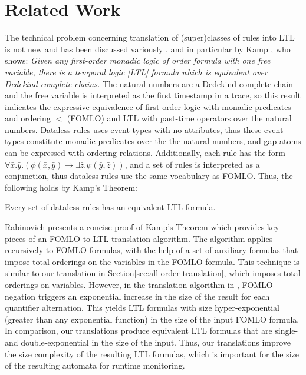 \section{Related Work}
\label{sec:comparison}

The technical problem concerning translation of
(super)classes of rules into LTL is not new and has been discussed
variously \cite{gabbay1980temporal, gabbay1981expressive, hodkinson1995expressive},
and in particular by Kamp \cite{kamp1968tense},
who shows:
{\em Given any first-order monadic logic of order formula with one free variable,
there is a temporal logic [LTL]
formula which is equivalent over Dedekind-complete chains.}
The natural numbers are a Dedekind-complete chain
and
the free variable is interpreted
as the first timestamp in a trace,
so
this result indicates 
the expressive equivalence of
first-order logic with monadic predicates and ordering $<$ (FOMLO)
and LTL with past-time operators over the natural numbers.
Dataless rules uses event types with no attributes,
thus these event types constitute monadic predicates
over the the natural numbers,
and
gap atoms can be expressed with ordering relations.
Additionally,
each rule has the form
$\forall \bar{x}.\bar{y}.(\phi(\bar{x},\bar{y})\rightarrow\exists\bar{z}.\psi(\bar{y},\bar{z}))$,
and a set of rules is interpreted as a conjunction,
thus dataless rules use the same vocabulary as FOMLO.
Thus, the following holds by Kamp's Theorem:

\begin{thm}\label{thm:kamp}
  \cite{kamp1968tense} Every set of dataless rules has an equivalent LTL formula.
\end{thm}

Rabinovich \cite{rabinovich2014proof} 
presents a concise proof of Kamp's Theorem
which provides key pieces of an FOMLO-to-LTL translation algorithm.
The algorithm applies recursively to FOMLO formulas,
with the help of a set of auxiliary formulas
that impose total orderings on the variables in the FOMLO formula.
This technique is similar to our translation in Section\:\ref{sec:all-order-translation},
which imposes total orderings on variables.
However,
in the translation algorithm in \cite{rabinovich2014proof},
FOMLO negation triggers an exponential increase in the size of the
result for each quantifier alternation.
This yields LTL formulas with size hyper-exponential
(greater than any exponential function) in the size of the input FOMLO formula.
In comparison,
our translations produce equivalent LTL formulas that are 
single- and double-exponential in the size of the input.
Thus,
our translations improve
the size complexity of the resulting LTL formulas,
which is important for the size of the resulting automata
for runtime monitoring.

